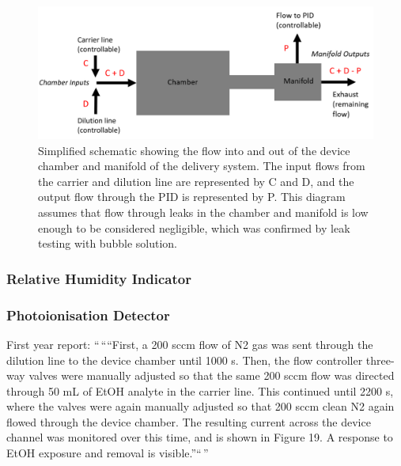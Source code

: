 \documentclass[
  a4paper,
]{scrbook}
\begin{document}
\begin{figure}

{\centering \includegraphics[width=1\textwidth,height=\textheight]{figures/ch5/chamber-manifold-v2.png}

}

\caption{Simplified schematic showing the flow into and out of the
device chamber and manifold of the delivery system. The input flows from
the carrier and dilution line are represented by C and D, and the output
flow through the PID is represented by P. This diagram assumes that flow
through leaks in the chamber and manifold is low enough to be considered
negligible, which was confirmed by leak testing with bubble solution.}

\end{figure}

\hypertarget{relative-humidity-indicator}{%
\subsubsection*{Relative Humidity
Indicator}\label{relative-humidity-indicator}}

\hypertarget{photoionisation-detector-1}{%
\subsubsection*{Photoionisation
Detector}\label{photoionisation-detector-1}}

First year report: ``\,````First, a 200 sccm flow of N2 gas was sent
through the dilution line to the device chamber until 1000 s. Then, the
flow controller three-way valves were manually adjusted so that the same
200 sccm flow was directed through 50 mL of EtOH analyte in the carrier
line. This continued until 2200 s, where the valves were again manually
adjusted so that 200 sccm clean N2 again flowed through the device
chamber. The resulting current across the device channel was monitored
over this time, and is shown in Figure 19. A response to EtOH exposure
and removal is visible.''``\,''
\end{document}
